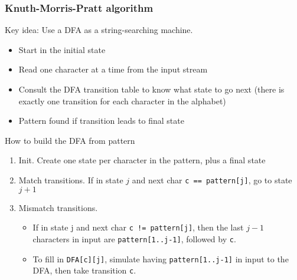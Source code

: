 \documentclass[a4paper]{article}
\begin{document}
\subsubsection*{Knuth-Morris-Pratt algorithm}
Key idea: Use a DFA as a string-searching machine.
\begin{itemize}
    \item Start in the initial state
    \item Read one character at a time from the input stream
    \item Consult the DFA transition table to know what state to go next (there is exactly one transition for each character in the alphabet)
    \item Pattern found if transition leads to final state
\end{itemize}
How to build the DFA from pattern
\begin{enumerate}
    \item Init. Create one state per character in the pattern, plus a final state
    \item Match transitions. If in state $j$ and next char \verb|c == pattern[j]|, go to state $j+1$
    \item Mismatch transitions.
    \begin{itemize}
        \item If in state j and next char \verb|c != pattern[j]|, then the last $j-1$ characters in input are \verb|pattern[1..j-1]|, followed by \verb|c|.
        \item To fill in \verb|DFA[c][j]|, simulate having \verb|pattern[1..j-1]| in input to the DFA, then take transition \verb|c|.
    \end{itemize}
\end{enumerate}
\end{document}
